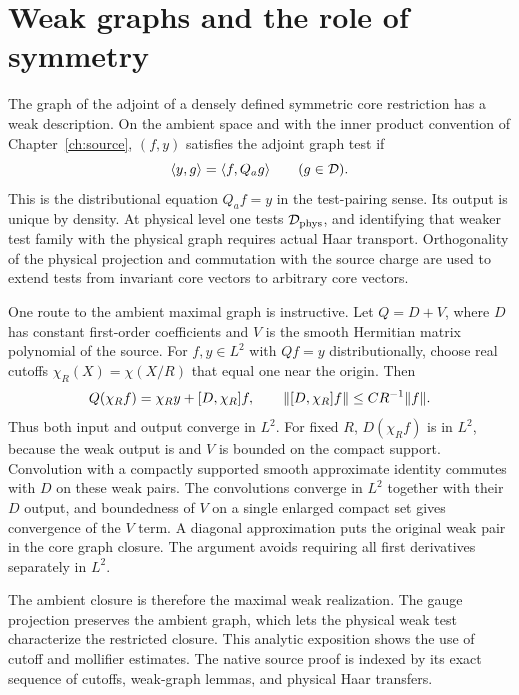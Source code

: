 \section{Weak graphs and the role of symmetry}
The graph of the adjoint of a densely defined symmetric core restriction has a weak description. On the ambient space and with the inner product convention of Chapter~\ref{ch:source}, $(f,y)$ satisfies the adjoint graph test if
\[
 \langle y,g\rangle=\langle f,Q_a g\rangle\qquad(g\in\mathcal D).
\]
This is the distributional equation $Q_a f=y$ in the test-pairing sense. Its output is unique by density. At physical level one tests $\mathcal D_{\mathrm{phys}}$, and identifying that weaker test family with the physical graph requires actual Haar transport. Orthogonality of the physical projection and commutation with the source charge are used to extend tests from invariant core vectors to arbitrary core vectors.

One route to the ambient maximal graph is instructive. Let $Q=D+V$, where $D$ has constant first-order coefficients and $V$ is the smooth Hermitian matrix polynomial of the source. For $f,y\in L^2$ with $Qf=y$ distributionally, choose real cutoffs $\chi_R(X)=\chi(X/R)$ that equal one near the origin. Then
\[
 Q(\chi_R f)=\chi_Ry+[D,\chi_R]f,\qquad
 \lVert [D,\chi_R]f\rVert\le C R^{-1}\lVert f\rVert.
\]
Thus both input and output converge in $L^2$. For fixed $R$, $D(\chi_R f)$ is in $L^2$, because the weak output is and $V$ is bounded on the compact support. Convolution with a compactly supported smooth approximate identity commutes with $D$ on these weak pairs. The convolutions converge in $L^2$ together with their $D$ output, and boundedness of $V$ on a single enlarged compact set gives convergence of the $V$ term. A diagonal approximation puts the original weak pair in the core graph closure. The argument avoids requiring all first derivatives separately in $L^2$.

The ambient closure is therefore the maximal weak realization. The gauge projection preserves the ambient graph, which lets the physical weak test characterize the restricted closure. This analytic exposition shows the use of cutoff and mollifier estimates. The native source proof is indexed by its exact sequence of cutoffs, weak-graph lemmas, and physical Haar transfers.

